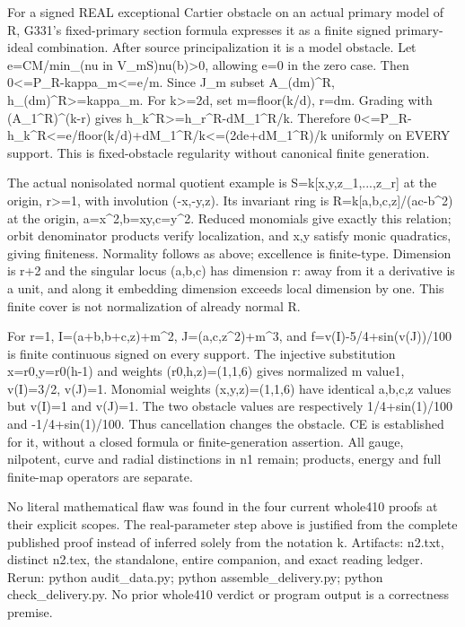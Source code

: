 \documentclass[11pt]{article}
\begin{document}
For a signed REAL exceptional Cartier obstacle on an actual primary model of R, G331's fixed-primary section formula expresses it as a finite signed primary-ideal combination. After source principalization it is a model obstacle. Let e=CM/min\_(nu in V\_mS)nu(b)\textgreater{}0, allowing e=0 in the zero case. Then 0\textless{}=P\_R-kappa\_m\textless{}=e/m. Since J\_m subset A\_(dm)\textasciicircum{}R, h\_(dm)\textasciicircum{}R\textgreater{}=kappa\_m. For k\textgreater{}=2d, set m=floor(k/d), r=dm. Grading with (A\_1\textasciicircum{}R)\textasciicircum{}(k-r) gives h\_k\textasciicircum{}R\textgreater{}=h\_r\textasciicircum{}R-dM\_1\textasciicircum{}R/k. Therefore 0\textless{}=P\_R-h\_k\textasciicircum{}R\textless{}=e/floor(k/d)+dM\_1\textasciicircum{}R/k\textless{}=(2de+dM\_1\textasciicircum{}R)/k uniformly on EVERY support. This is fixed-obstacle regularity without canonical finite generation.

The actual nonisolated normal quotient example is S=k[x,y,z\_1,...,z\_r] at the origin, r\textgreater{}=1, with involution (-x,-y,z). Its invariant ring is R=k[a,b,c,z]/(ac-b\textasciicircum{}2) at the origin, a=x\textasciicircum{}2,b=xy,c=y\textasciicircum{}2. Reduced monomials give exactly this relation; orbit denominator products verify localization, and x,y satisfy monic quadratics, giving finiteness. Normality follows as above; excellence is finite-type. Dimension is r+2 and the singular locus (a,b,c) has dimension r: away from it a derivative is a unit, and along it embedding dimension exceeds local dimension by one. This finite cover is not normalization of already normal R.

For r=1, I=(a+b,b+c,z)+m\textasciicircum{}2, J=(a,c,z\textasciicircum{}2)+m\textasciicircum{}3, and f=v(I)-5/4+sin(v(J))/100 is finite continuous signed on every support. The injective substitution x=r0,y=r0(h-1) and weights (r0,h,z)=(1,1,6) gives normalized m value1, v(I)=3/2, v(J)=1. Monomial weights (x,y,z)=(1,1,6) have identical a,b,c,z values but v(I)=1 and v(J)=1. The two obstacle values are respectively 1/4+sin(1)/100 and -1/4+sin(1)/100. Thus cancellation changes the obstacle. CE is established for it, without a closed formula or finite-generation assertion. All gauge, nilpotent, curve and radial distinctions in n1 remain; products, energy and full finite-map operators are separate.

No literal mathematical flaw was found in the four current whole410 proofs at their explicit scopes. The real-parameter step above is justified from the complete published proof instead of inferred solely from the notation k. Artifacts: n2.txt, distinct n2.tex, the standalone, entire companion, and exact reading ledger. Rerun: python audit\_data.py; python assemble\_delivery.py; python check\_delivery.py. No prior whole410 verdict or program output is a correctness premise.
\end{document}
